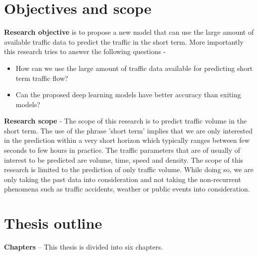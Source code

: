 \section{Objectives and scope}

\textbf{Research objective} is to propose a new model that can use the large amount of available
traffic data to predict the traffic in the short term. More importantly this research tries to
answer the following questions -

\begin{itemize}
\item How can we use the large amount of traffic data available for predicting short term traffic
 flow?
\item Can the proposed deep learning models have better accuracy than exiting models?
\end{itemize}

\textbf{Research scope} - The scope of this research is to predict traffic volume in the
short term. The use of the phrase 'short term' implies that we are only interested in the
prediction within a very short horizon which typically ranges between few seconds to few
hours in practice. The traffic parameters that are of usually of interest to be predicted are
volume, time, speed and density. The scope of this research is limited to the prediction of only
traffic volume. While doing so, we are only taking the past data into consideration and not
taking the non-recurrent phenomena such as traffic accidents, weather or public events into
consideration.


\section{Thesis outline}

\textbf{Chapters} -- This thesis is divided into six chapters.

